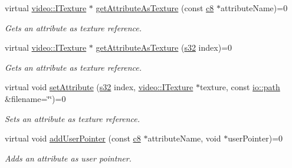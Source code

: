 \begin{DoxyCompactItemize}
virtual \hyperlink{classirr_1_1video_1_1ITexture}{video\+::\+I\+Texture} $\ast$ \hyperlink{classirr_1_1io_1_1IAttributes_a2044beb7dcf310beb95ed0f4008f2b27}{get\+Attribute\+As\+Texture} (const \hyperlink{namespaceirr_a9395eaea339bcb546b319e9c96bf7410}{c8} $\ast$attribute\+Name)=0
\begin{DoxyCompactList}\small\item\em Gets an attribute as texture reference. \end{DoxyCompactList}\item 
virtual \hyperlink{classirr_1_1video_1_1ITexture}{video\+::\+I\+Texture} $\ast$ \hyperlink{classirr_1_1io_1_1IAttributes_ad022db880ccf7844c720efceef7c22fc}{get\+Attribute\+As\+Texture} (\hyperlink{namespaceirr_ac66849b7a6ed16e30ebede579f9b47c6}{s32} index)=0
\begin{DoxyCompactList}\small\item\em Gets an attribute as texture reference. \end{DoxyCompactList}\item 
\mbox{\label{classirr_1_1io_1_1IAttributes_a31db1888f86c81f35caab8414ef8dcfc}} 
virtual void \hyperlink{classirr_1_1io_1_1IAttributes_a31db1888f86c81f35caab8414ef8dcfc}{set\+Attribute} (\hyperlink{namespaceirr_ac66849b7a6ed16e30ebede579f9b47c6}{s32} index, \hyperlink{classirr_1_1video_1_1ITexture}{video\+::\+I\+Texture} $\ast$texture, const \hyperlink{namespaceirr_1_1io_a6468281622ce3a1c46b72e19f32dded5}{io\+::path} \&filename=\char`\"{}\char`\"{})=0
\begin{DoxyCompactList}\small\item\em Sets an attribute as texture reference. \end{DoxyCompactList}\item 
\mbox{\label{classirr_1_1io_1_1IAttributes_a04717eae75a539cd87ea057bf0444db2}} 
virtual void \hyperlink{classirr_1_1io_1_1IAttributes_a04717eae75a539cd87ea057bf0444db2}{add\+User\+Pointer} (const \hyperlink{namespaceirr_a9395eaea339bcb546b319e9c96bf7410}{c8} $\ast$attribute\+Name, void $\ast$user\+Pointer)=0
\begin{DoxyCompactList}\small\item\em Adds an attribute as user pointner. \end{DoxyCompactList}\item 
\mbox{\label{classirr_1_1io_1_1IAttributes_a558e6bb8c92226e99cd5b858db1b3ea8}} 

\end{DoxyCompactItemize}
